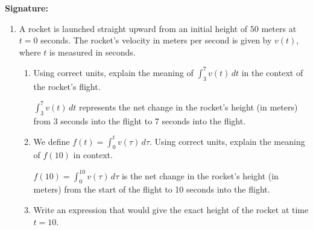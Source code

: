 \documentclass{article}
\begin{document}
\vfill

\vspace{0.3in}

{\large \mbox{} \hfill \bf Signature:\underline{\hspace{3in}}}
\thispagestyle{empty}

\newpage

\begin{enumerate}

\item 
\begin{problem}
A rocket is launched straight upward from an initial height of $50$ meters at $t=0$ seconds.  The rocket's velocity in meters per second is given by $v(t)$, where $t$ is measured in seconds.
\end{problem}

\begin{enumerate}
    \item 
    \begin{problem} 
    Using correct units, explain the meaning of 
    $\displaystyle\int_3^{7} v(t)\,dt$ in the context of the rocket's flight.
    \end{problem}
\pspace{\vfill}

\begin{solution}
    $\displaystyle\int_3^{7} v(t)\,dt$ represents the net change in the rocket's height (in meters) from 3 seconds into the flight to 7 seconds into the flight.
\end{solution}

\item 
\begin{problem}
We define $f(t)=\displaystyle\int_0^t v(\tau)\,d\tau$. Using correct units, explain the meaning of $f(10)$ in context.
\end{problem}
\pspace{\vfill}

\begin{solution}
    $f(10)=\displaystyle\int_0^{10} v(\tau)\,d\tau$ is the net change in the rocket's height (in meters) from the start of the flight to 10 seconds into the flight.
\end{solution}

\item
\begin{problem} 
Write an expression that would give the exact height of the rocket at time $t=10$.
\end{problem}
\pspace{\vfill}


\end{enumerate}
\end{enumerate}
\end{document}

